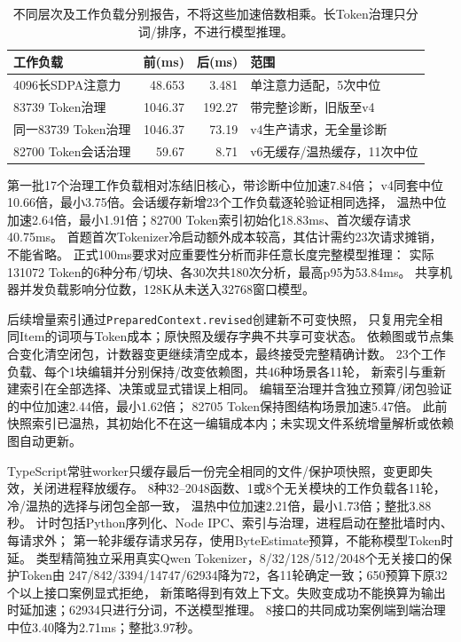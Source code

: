 \documentclass[UTF8,a4paper,11pt,fontset=fandol]{ctexart}
\begin{document}
\begin{table}[ht]
\centering\small
\begin{tabular}{lrrl}
\toprule
工作负载 & 前(ms) & 后(ms) & 范围\\
\midrule
4096长SDPA注意力 & 48.653 & 3.481 & 单注意力适配，5次中位\\
83739 Token治理 & 1046.37 & 192.27 & 带完整诊断，旧版至v4\\
同一83739 Token治理 & 1046.37 & 73.19 & v4生产请求，无全量诊断\\
82700 Token会话治理 & 59.67 & 8.71 & v6无缓存/温热缓存，11次中位\\
\bottomrule
\end{tabular}
\caption{不同层次及工作负载分别报告，不将这些加速倍数相乘。长Token治理只分词/排序，不进行模型推理。}
\end{table}

第一批17个治理工作负载相对冻结旧核心，带诊断中位加速7.84倍；
v4同套中位10.66倍，最小3.75倍。会话缓存新增23个工作负载逐轮验证相同选择，
温热中位加速2.64倍，最小1.91倍；82700 Token索引初始化18.83ms、首次缓存请求40.75ms。
首题首次Tokenizer冷启动额外成本较高，其估计需约23次请求摊销，不能省略。
正式100ms要求对应重要性分析而非任意长度完整模型推理：
实际131072 Token的6种分布/切块、各30次共180次分析，最高p95为53.84ms。
共享机器并发负载影响分位数，128K从未送入32768窗口模型。

后续增量索引通过\texttt{PreparedContext.revised}创建新不可变快照，
只复用完全相同Item的词项与Token成本；原快照及缓存字典不共享可变状态。
依赖图或节点集合变化清空闭包，计数器变更继续清空成本，最终接受完整精确计数。
23个工作负载、每个1块编辑并分别保持/改变依赖图，共46种场景各11轮，
新索引与重新建索引在全部选择、决策或显式错误上相同。
编辑至治理并含独立预算/闭包验证的中位加速2.44倍，最小1.62倍；
82705 Token保持图结构场景加速5.47倍。
此前快照索引已温热，其初始化不在这一编辑成本内；未实现文件系统增量解析或依赖图自动更新。

TypeScript常驻worker只缓存最后一份完全相同的文件/保护项快照，变更即失效，关闭进程释放缓存。
8种32--2048函数、1或8个无关模块的工作负载各11轮，冷/温热的选择与闭包全部一致，
温热中位加速2.21倍，最小1.73倍；整批3.88秒。
计时包括Python序列化、Node IPC、索引与治理，进程启动在整批墙时内、每请求外；
第一轮非缓存请求另存，使用ByteEstimate预算，不能称模型Token时延。
类型精简独立采用真实Qwen Tokenizer，8/32/128/512/2048个无关接口的保护Token由
247/842/3394/14747/62934降为72，各11轮确定一致；650预算下原32个以上接口案例显式拒绝，
新策略得到有效上下文。失败变成功不能换算为输出时延加速；62934只进行分词，不送模型推理。
8接口的共同成功案例端到端治理中位3.40降为2.71ms；整批3.97秒。
\end{document}
